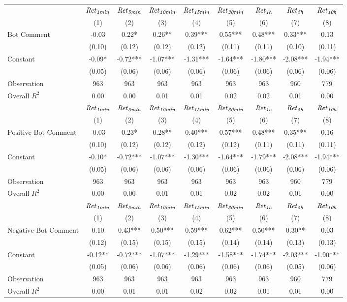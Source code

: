 \begin{tabular}{lcccccccc}
\hline
 & ${\it Ret}_{\it 1min}$ & ${\it Ret}_{\it 5min}$ & ${\it Ret}_{\it 10min}$ & ${\it Ret}_{\it 15min}$ & ${\it Ret}_{\it 30min}$ & ${\it Ret}_{\it 1h}$ & ${\it Ret}_{\it 5h}$ & ${\it Ret}_{\it 10h}$ \\
 & (1) & (2) & (3) & (4) & (5) & (6) & (7) & (8) \\
\hline
$\text{Bot Comment}$ & -0.03 & 0.22* & 0.26** & 0.39*** & 0.55*** & 0.48*** & 0.33*** & 0.13 \\
 & (0.10) & (0.12) & (0.12) & (0.12) & (0.11) & (0.11) & (0.10) & (0.11) \\
Constant & -0.09* & -0.72*** & -1.07*** & -1.31*** & -1.64*** & -1.80*** & -2.08*** & -1.94*** \\
 & (0.05) & (0.06) & (0.06) & (0.06) & (0.06) & (0.06) & (0.06) & (0.06) \\
Observation & 963 & 963 & 963 & 963 & 963 & 963 & 960 & 779 \\
Overall $R^2$ & 0.00 & 0.00 & 0.01 & 0.01 & 0.02 & 0.02 & 0.01 & 0.00 \\
\hline
 & ${\it Ret}_{\it 1min}$ & ${\it Ret}_{\it 5min}$ & ${\it Ret}_{\it 10min}$ & ${\it Ret}_{\it 15min}$ & ${\it Ret}_{\it 30min}$ & ${\it Ret}_{\it 1h}$ & ${\it Ret}_{\it 5h}$ & ${\it Ret}_{\it 10h}$ \\
 & (1) & (2) & (3) & (4) & (5) & (6) & (7) & (8) \\
\hline
$\text{Positive Bot Comment}$ & -0.03 & 0.23* & 0.28** & 0.40*** & 0.57*** & 0.48*** & 0.35*** & 0.16 \\
 & (0.10) & (0.12) & (0.12) & (0.12) & (0.12) & (0.11) & (0.11) & (0.11) \\
Constant & -0.10* & -0.72*** & -1.07*** & -1.30*** & -1.64*** & -1.79*** & -2.08*** & -1.94*** \\
 & (0.05) & (0.06) & (0.06) & (0.06) & (0.06) & (0.06) & (0.06) & (0.06) \\
Observation & 963 & 963 & 963 & 963 & 963 & 963 & 960 & 779 \\
Overall $R^2$ & 0.00 & 0.00 & 0.01 & 0.01 & 0.02 & 0.02 & 0.01 & 0.00 \\
\hline
 & ${\it Ret}_{\it 1min}$ & ${\it Ret}_{\it 5min}$ & ${\it Ret}_{\it 10min}$ & ${\it Ret}_{\it 15min}$ & ${\it Ret}_{\it 30min}$ & ${\it Ret}_{\it 1h}$ & ${\it Ret}_{\it 5h}$ & ${\it Ret}_{\it 10h}$ \\
 & (1) & (2) & (3) & (4) & (5) & (6) & (7) & (8) \\
\hline
$\text{Negative Bot Comment}$ & 0.10 & 0.43*** & 0.50*** & 0.59*** & 0.62*** & 0.50*** & 0.30** & 0.03 \\
 & (0.12) & (0.15) & (0.15) & (0.15) & (0.14) & (0.14) & (0.13) & (0.13) \\
Constant & -0.12** & -0.72*** & -1.07*** & -1.29*** & -1.58*** & -1.74*** & -2.03*** & -1.90*** \\
 & (0.05) & (0.06) & (0.06) & (0.06) & (0.06) & (0.06) & (0.05) & (0.06) \\
Observation & 963 & 963 & 963 & 963 & 963 & 963 & 960 & 779 \\
Overall $R^2$ & 0.00 & 0.01 & 0.01 & 0.02 & 0.02 & 0.01 & 0.01 & 0.00 \\
\hline
\end{tabular}
